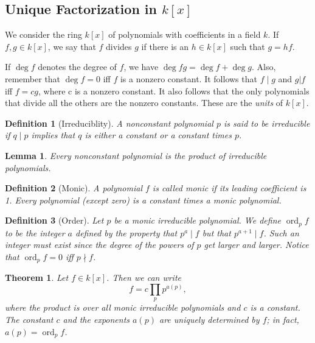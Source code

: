 \documentclass{article}
\newtheorem*{definition*}{Definition}
\newtheorem{lemma}{Lemma}
\numberwithin{proposition}{subsection}
\newtheorem{theorem}{Theorem}
\DeclareMathOperator{\ord}{ord}
\begin{document}
\subsection{Unique Factorization in $k[x]$}

We consider the ring $k[x]$ of polynomials with coefficients in a field $k$. If
$f, g \in k[x]$, we say that $f$ divides $g$ if there is an $h \in k[x]$ such
that $g = hf$.

If $\deg f$ denotes the degree of $f$, we have $\deg fg = \deg f + \deg g$.
Also, remember that $\deg f = 0$ iff $f$ is a nonzero constant. It follows
that $f \mid g$ and $g | f$ iff $f = cg$, where c is a nonzero constant. It
also follows that the only polynomials that divide all the others are the
nonzero constants. These are the \emph{units} of $k[x]$.

\begin{definition*}[Irreduciblity]
  A nonconstant polynomial $p$ is said to be \emph{irreducible} if $q \mid p$
  implies that $q$ is either a constant or a constant times $p$.
\end{definition*}

\setcounter{lemma}{0}
\begin{lemma}
  Every nonconstant polynomial is the product of irreducible polynomials.
\end{lemma}

\begin{definition*}[Monic]
  A polynomial $f$ is called \emph{monic} if its leading coefficient is 1.
  Every polynomial (except zero) is a constant times a monic polynomial.
\end{definition*}

\begin{definition*}[Order]
  Let $p$ be a monic irreducible polynomial. We define $\ord_p f$ to be the
  integer $a$ defined by the property that $p^a \mid f$ but that $p^{a + 1}
  \mid f$. Such an integer must exist since the degree of the powers of $p$ get
  larger and larger. Notice that $\ord_p f = 0$ iff $p \nmid f$.
\end{definition*}

\begin{theorem}
  Let $f \in k[x]$. Then we can write \[ f = c\prod_p p^{a(p)}, \] where the
  product is over all monic irreducible polynomials and $c$ is a constant. The
  constant $c$ and the exponents $a(p)$ are uniquely determined by $f$; in
  fact, $a(p) = \ord_p f$.
\end{theorem}
\end{document}
